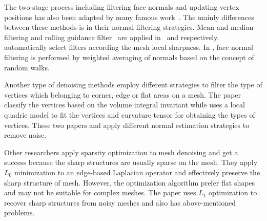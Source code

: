 The two-stage process including filtering face normals and updating vertex positions has also been adapted by many famous work~\cite{yagou2002mesh, chen2005sharpness, sun2008random, Wang2015rolling}.
The mainly differences between these methods is in their normal filtering strategies.
Mean and median filtering and rolling guidance filter~\cite{Zhang2014rolling} are applied in~\cite{yagou2002mesh} and \cite{Wang2015rolling} respectively.
\cite{chen2005sharpness} automatically select filters according the mesh local sharpness.
In \cite{sun2008random}, face normal filtering is performed by weighted averaging of normals based on the concept of random walks.

Another type of denoising methods employ different strategies to filter the type of vertices which belonging to corner, edge or flat areas on a mesh.
The paper \cite{bian2011feature} classify the vertices based on the volume integral invariant
while \cite{fan2010robust} uses a local quadric model to fit the vertices and curvature tensor for obtaining the types of vertices.
These two papers \cite{wang2012cascaded} and \cite{wei2015bi} apply different normal estimation strategies to remove noise.

Other researchers \cite{he2013mesh} apply sparsity optimization to mesh denoising and get a success because the sharp structures are usually sparse on the mesh.
They apply $L_0$ minimization to an edge-based Laplacian operator and effectively preserve the sharp structure of mesh.
However, the optimization algorithm prefer flat shapes and may not be suitable for complex meshes.
The paper \cite{Wang2014decoupling} uses $L_1$ optimization to recover sharp structures from noisy meshes and also has above-mentioned problems.






